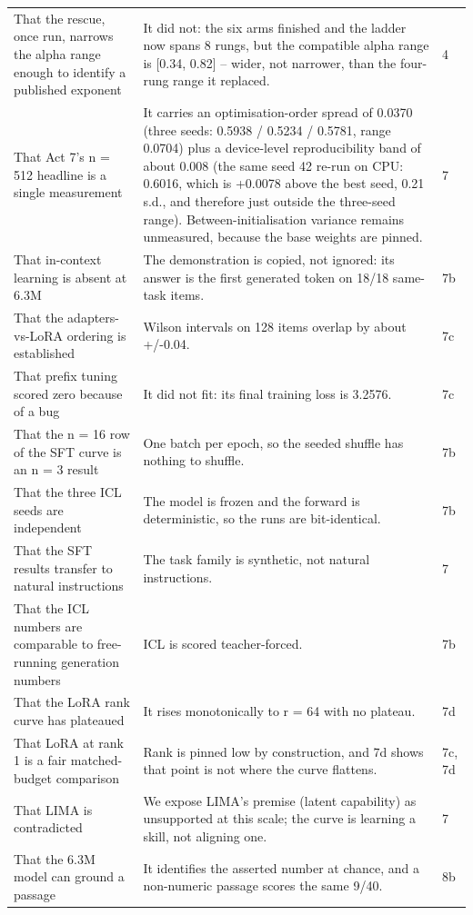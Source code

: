 \begin{longtable}{L{7.6cm}L{5.4cm}L{1.6cm}}
That the rescue, once run, narrows the alpha range enough to identify a published exponent & It did not: the six arms finished and the ladder now spans 8 rungs, but the compatible alpha range is [0.34, 0.82] -- wider, not narrower, than the four-rung range it replaced. & 4 \\
That Act 7's n = 512 headline is a single measurement & It carries an optimisation-order spread of 0.0370 (three seeds: 0.5938 / 0.5234 / 0.5781, range 0.0704) plus a device-level reproducibility band of about 0.008 (the same seed 42 re-run on CPU: 0.6016, which is +0.0078 above the best seed, 0.21 s.d., and therefore just outside the three-seed range). Between-initialisation variance remains unmeasured, because the base weights are pinned. & 7 \\
That in-context learning is absent at 6.3M & The demonstration is copied, not ignored: its answer is the first generated token on 18/18 same-task items. & 7b \\
That the adapters-vs-LoRA ordering is established & Wilson intervals on 128 items overlap by about +/-0.04. & 7c \\
That prefix tuning scored zero because of a bug & It did not fit: its final training loss is 3.2576. & 7c \\
That the n = 16 row of the SFT curve is an n = 3 result & One batch per epoch, so the seeded shuffle has nothing to shuffle. & 7b \\
That the three ICL seeds are independent & The model is frozen and the forward is deterministic, so the runs are bit-identical. & 7b \\
That the SFT results transfer to natural instructions & The task family is synthetic, not natural instructions. & 7 \\
That the ICL numbers are comparable to free-running generation numbers & ICL is scored teacher-forced. & 7b \\
That the LoRA rank curve has plateaued & It rises monotonically to r = 64 with no plateau. & 7d \\
That LoRA at rank 1 is a fair matched-budget comparison & Rank is pinned low by construction, and 7d shows that point is not where the curve flattens. & 7c, 7d \\
That LIMA is contradicted & We expose LIMA's premise (latent capability) as unsupported at this scale; the curve is learning a skill, not aligning one. & 7 \\
That the 6.3M model can ground a passage & It identifies the asserted number at chance, and a non-numeric passage scores the same 9/40. & 8b \\

\end{longtable}
